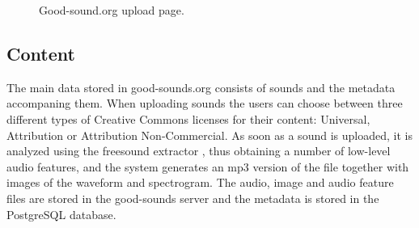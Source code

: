 \documentclass{article}
\begin{document}
\begin{figure}
 \centerline{}
 \caption{Good-sound.org upload page.}
 \label{fig:upload}
\end{figure}

\subsection{Content}
The main data stored in good-sounds.org consists of sounds and the metadata accompaning them. When uploading sounds the users can choose between three different types of Creative Commons licenses for their content: Universal, Attribution or Attribution Non-Commercial. As soon as a sound is uploaded, it is analyzed using the freesound extractor \cite{02}, thus obtaining a number of low-level audio features, and the system generates an mp3 version of the file together with images of the waveform and spectrogram. The audio, image and audio feature files are stored in the good-sounds server and the metadata is stored in the PostgreSQL database. 
\end{document}
